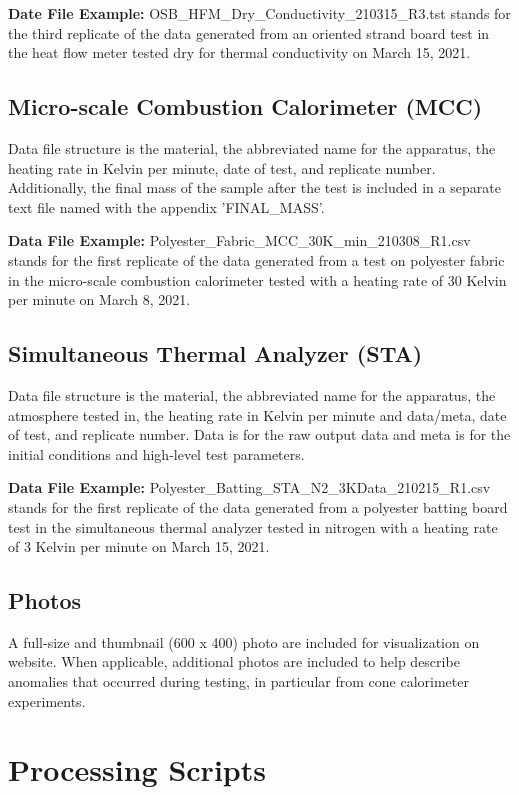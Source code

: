 \documentclass[12pt,oneside]{book}
\begin{document}
{\bf Date File Example:} OSB\_HFM\_Dry\_Conductivity\_210315\_R3.tst stands for the third replicate of the data generated from an oriented strand board test in the heat flow meter tested dry for thermal conductivity on March 15, 2021.

\subsection{Micro-scale Combustion Calorimeter (MCC)}
Data file structure is the material, the abbreviated name for the apparatus, the heating rate in Kelvin per minute, date of test, and replicate number. Additionally, the final mass of the sample after the test is included in a separate text file named with the appendix 'FINAL\_MASS'.

{\bf Data File Example:} Polyester\_Fabric\_MCC\_30K\_min\_210308\_R1.csv stands for the first replicate of the data generated from a test on polyester fabric in the micro-scale combustion calorimeter tested with a heating rate of 30 Kelvin per minute on March 8, 2021.

\subsection{Simultaneous Thermal Analyzer (STA)}
Data file structure is the material, the abbreviated name for the apparatus, the atmosphere tested in, the heating rate in Kelvin per minute and data/meta, date of test, and replicate number. Data is for the raw output data and meta is for the initial conditions and high-level test parameters.

{\bf Data File Example:} Polyester\_Batting\_STA\_N2\_3KData\_210215\_R1.csv stands for the first replicate of the data generated from a polyester batting board test in the simultaneous thermal analyzer tested in nitrogen with a heating rate of 3 Kelvin per minute on March 15, 2021.

\subsection{Photos}
A full-size and thumbnail (600 x 400) photo are included for visualization on website. When applicable, additional photos are included to help describe anomalies that occurred during testing, in particular from cone calorimeter experiments.

\section{Processing Scripts}
\label{sec:scripts}
\end{document}
